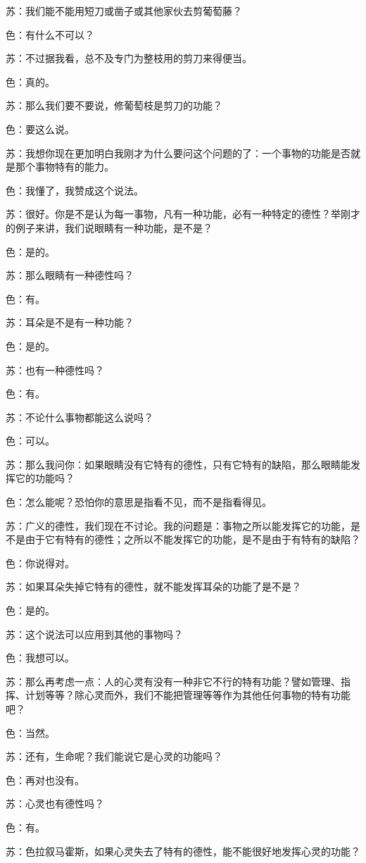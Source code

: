 \documentclass[12pt,oneside]{book}
\begin{document}
苏：我们能不能用短刀或凿子或其他家伙去剪葡萄藤？

色：有什么不可以？

苏：不过据我看，总不及专门为整枝用的剪刀来得便当。

色：真的。

苏：那么我们要不要说，修葡萄枝是剪刀的功能？

色：要这么说。

苏：我想你现在更加明白我刚才为什么要问这个问题的了：一个事物的功能是否就是那个事物特有的能力。

色：我懂了，我赞成这个说法。

苏：很好。你是不是认为每一事物，凡有一种功能，必有一种特定的德性？举刚才的例子来讲，我们说眼睛有一种功能，是不是？

色：是的。

苏：那么眼睛有一种德性吗？

色：有。

苏：耳朵是不是有一种功能？

色：是的。

苏：也有一种德性吗？

色：有。

苏：不论什么事物都能这么说吗？

色：可以。

苏：那么我问你：如果眼睛没有它特有的德性，只有它特有的缺陷，那么眼睛能发挥它的功能吗？

色：怎么能呢？恐怕你的意思是指看不见，而不是指看得见。

苏：广义的德性，我们现在不讨论。我的问题是：事物之所以能发挥它的功能，是不是由于它有特有的德性；之所以不能发挥它的功能，是不是由于有特有的缺陷？

色：你说得对。

苏：如果耳朵失掉它特有的德性，就不能发挥耳朵的功能了是不是？

色：是的。

苏：这个说法可以应用到其他的事物吗？

色：我想可以。

苏：那么再考虑一点：人的心灵有没有一种非它不行的特有功能？譬如管理、指挥、计划等等？除心灵而外，我们不能把管理等等作为其他任何事物的特有功能吧？

色：当然。

苏：还有，生命呢？我们能说它是心灵的功能吗？

色：再对也没有。

苏：心灵也有德性吗？

色：有。

苏：色拉叙马霍斯，如果心灵失去了特有的德性，能不能很好地发挥心灵的功能？
\end{document}
